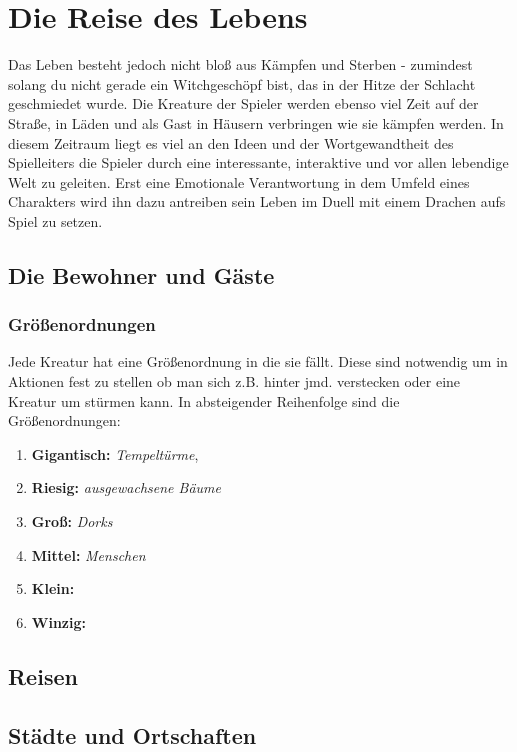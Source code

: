 \chapter{Die Reise des Lebens}

Das Leben besteht jedoch nicht bloß aus Kämpfen und Sterben - zumindest solang du nicht gerade ein Witchgeschöpf bist, das in der Hitze der Schlacht geschmiedet wurde. Die Kreature der Spieler werden ebenso viel Zeit auf der Straße, in Läden und als Gast in Häusern verbringen wie sie kämpfen werden. In diesem Zeitraum liegt es viel an den Ideen und der Wortgewandtheit des Spielleiters die Spieler durch eine interessante, interaktive und vor allen lebendige Welt zu geleiten. Erst eine Emotionale Verantwortung in dem Umfeld eines Charakters wird ihn dazu antreiben sein Leben im Duell mit einem Drachen aufs Spiel zu setzen.

\section{Die Bewohner und Gäste}

\subsection*{Größenordnungen}
Jede Kreatur hat eine Größenordnung in die sie fällt. Diese sind notwendig um in Aktionen fest zu stellen ob man sich z.B. hinter jmd. verstecken oder eine Kreatur um stürmen kann. In absteigender Reihenfolge sind die Größenordnungen:

\begin{enumerate}
    \item \textbf{Gigantisch:} \textit{Tempeltürme}, \textit{}
    \item \textbf{Riesig:} \textit{ausgewachsene Bäume}
    \item \textbf{Groß:} \textit{Dorks}
    \item \textbf{Mittel:} \textit{Menschen}
    \item \textbf{Klein:}
    \item \textbf{Winzig:}
\end{enumerate}



\section{Reisen}
\section{Städte und Ortschaften}

